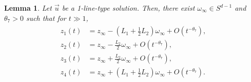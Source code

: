 \documentclass[10pt,a4paper]{amsart}
\newtheorem{lemma}[theorem]{Lemma}
\numberwithin{equation}{section}
\begin{document}
\begin{lemma}\label{1-line-type-asymp}
Let $\vec{u}$ be a 1-line-type solution. Then, there exist $\omega_{\infty}\in S^{d-1}$ and $\theta_7>0$ such that for $t\gg 1$,
\begin{align}\label{1-typeasumpes}
\begin{aligned}
z_1(t)&=z_{\infty}-\left(L_1+\frac{1}{2}L_2\right)\omega_{\infty}+O\left(t^{-\theta_7}\right),
\\
z_2(t)&=z_{\infty}-\frac{L_2}{2}\omega_{\infty}+O\left(t^{-\theta_7}\right),
\\
z_3(t)&=z_{\infty}+\frac{L_2}{2}\omega_{\infty}+O\left(t^{-\theta_7}\right),
\\
z_4(t)&=z_{\infty}+\left(L_1+\frac{1}{2}L_2\right)\omega_{\infty}+O\left(t^{-\theta_7}\right).
\end{aligned}
\end{align}
\end{lemma}
\end{document}
